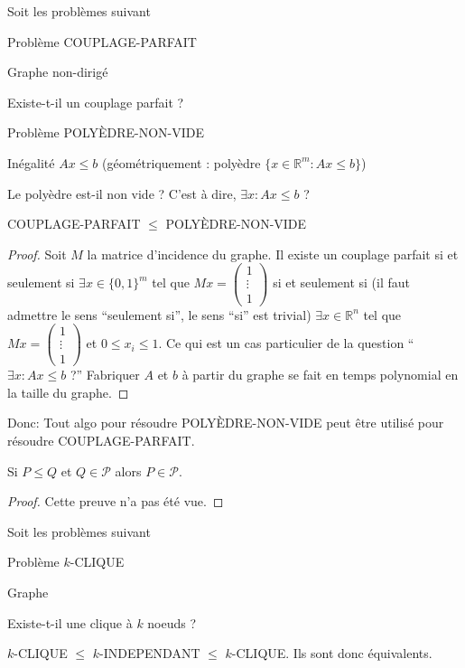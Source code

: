 \begin{myexem}
  Soit les problèmes suivant
  \begin{description}
    \item{Problème} COUPLAGE-PARFAIT
    \item[Instance] Graphe non-dirigé
    \item[Question] Existe-t-il un couplage parfait ?
  \end{description}
  \begin{description}
    \item{Problème} POLYÈDRE-NON-VIDE
    \item[Instance] Inégalité $Ax \leq b$ (géométriquement : polyèdre $\{x \in \mathbb{R}^m : Ax \leq b\}$)
    \item[Question] Le polyèdre est-il non vide ? C'est à dire, $\exists x : Ax \leq b$ ?
  \end{description}
  COUPLAGE-PARFAIT $\leq$ POLYÈDRE-NON-VIDE
  \begin{proof}
    Soit $M$ la matrice d'incidence du graphe.
    Il existe un couplage parfait si et seulement si $\exists x \in \{0,1\}^m$ tel que
    $Mx = \begin{pmatrix}
      1\\
      \vdots\\
      1
    \end{pmatrix}$ si et seulement si (il faut admettre le sens ``seulement si'', le sens ``si'' est trivial)
    $\exists x \in \mathbb{R}^n$ tel que $Mx = \begin{pmatrix}
      1\\
      \vdots\\
      1
    \end{pmatrix}$ et $0 \leq x_i \leq 1$.
    Ce qui est un cas particulier de la question
    ``$\exists x : Ax \leq b$ ?''
    Fabriquer $A$ et $b$ à partir du graphe se fait en temps polynomial en la taille du graphe.
  \end{proof}
  Donc: Tout algo pour résoudre POLYÈDRE-NON-VIDE peut être utilisé pour résoudre COUPLAGE-PARFAIT.
\end{myexem}

\begin{mytheo}
  Si $P \leq Q$ et $Q \in \mathcal{P}$ alors $P \in \mathcal{P}$.
  \begin{proof}
     Cette preuve n'a pas été vue.
  \end{proof}
\end{mytheo}

\begin{myexem}
  Soit les problèmes suivant
  \begin{description}
    \item{Problème} $k$-CLIQUE
    \item[Instance] Graphe
    \item[Question] Existe-t-il une clique à $k$ noeuds ?
  \end{description}
  $k$-CLIQUE $\leq$ $k$-INDEPENDANT $\leq$ $k$-CLIQUE.
  Ils sont donc équivalents.
\end{myexem}

